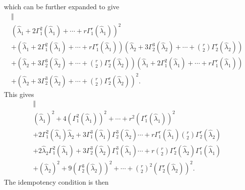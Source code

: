 \documentclass[aps,preprint]{revtex4}%
\begin{document}
which can be further expanded to give
\begin{gather}
\Vert\nonumber\\
\left(  \hat{\lambda}_{1}+2\Gamma_{1}^{2}\left(  \hat{\lambda}_{1}\right)
+\cdots+r\Gamma_{1}^{r}\left(  \hat{\lambda}_{1}\right)  \right)
^{2}\nonumber\\
+\left(  \hat{\lambda}_{1}+2\Gamma_{1}^{2}\left(  \hat{\lambda}_{1}\right)
+\cdots+r\Gamma_{1}^{r}\left(  \hat{\lambda}_{1}\right)  \right)  \left(
\hat{\lambda}_{2}+3\Gamma_{2}^{3}\left(  \hat{\lambda}_{2}\right)
+\cdots+\binom{r}{2}\Gamma_{2}^{r}\left(  \hat{\lambda}_{2}\right)  \right)
\nonumber\\
+\left(  \hat{\lambda}_{2}+3\Gamma_{2}^{3}\left(  \hat{\lambda}_{2}\right)
+\cdots+\binom{r}{2}\Gamma_{2}^{r}\left(  \hat{\lambda}_{2}\right)  \right)
\left(  \hat{\lambda}_{1}+2\Gamma_{1}^{2}\left(  \hat{\lambda}_{1}\right)
+\cdots+r\Gamma_{1}^{r}\left(  \hat{\lambda}_{1}\right)  \right) \nonumber\\
+\left(  \hat{\lambda}_{2}+3\Gamma_{2}^{3}\left(  \hat{\lambda}_{2}\right)
+\cdots+\binom{r}{2}\Gamma_{2}^{r}\left(  \hat{\lambda}_{2}\right)  \right)
^{2}.
\end{gather}
This gives
\begin{gather}
\Vert\nonumber\\
\left(  \hat{\lambda}_{1}\right)  ^{2}+4\left(  \Gamma_{1}^{2}\left(
\hat{\lambda}_{1}\right)  \right)  ^{2}+\cdots+r^{2}\left(  \Gamma_{1}%
^{r}\left(  \hat{\lambda}_{1}\right)  \right)  ^{2}\nonumber\\
+2\Gamma_{1}^{2}\left(  \hat{\lambda}_{1}\right)  \hat{\lambda}_{2}%
+3\Gamma_{1}^{3}\left(  \hat{\lambda}_{1}\right)  \Gamma_{2}^{3}\left(
\hat{\lambda}_{2}\right)  \cdots+r\Gamma_{1}^{r}\left(  \hat{\lambda}%
_{1}\right)  \binom{r}{2}\Gamma_{2}^{r}\left(  \hat{\lambda}_{2}\right)
\nonumber\\
+2\hat{\lambda}_{2}\Gamma_{1}^{2}\left(  \hat{\lambda}_{1}\right)
+3\Gamma_{2}^{3}\left(  \hat{\lambda}_{2}\right)  \Gamma_{1}^{3}\left(
\hat{\lambda}_{1}\right)  \cdots+r\binom{r}{2}\Gamma_{2}^{r}\left(
\hat{\lambda}_{2}\right)  \Gamma_{1}^{r}\left(  \hat{\lambda}_{1}\right)
\nonumber\\
+\left(  \hat{\lambda}_{2}\right)  ^{2}+9\left(  \Gamma_{2}^{3}\left(
\hat{\lambda}_{2}\right)  \right)  ^{2}+\cdots+\binom{r}{2}^{2}\left(
\Gamma_{2}^{r}\left(  \hat{\lambda}_{2}\right)  \right)  ^{2}.
\end{gather}
The idempotency condition is then
\end{document}
